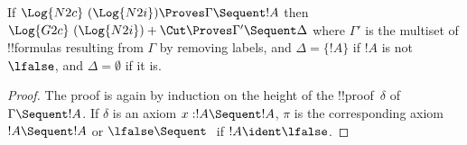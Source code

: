 \documentclass[../../../include/open-logic-section]{subfiles}
\begin{document}


\begin{prop} If $\Log{N2c}\ (\Log{N2i}) \Proves
\Gamma \Sequent !A$ then $\Log{G2c}\ (\Log{N2i}) + \Cut \Proves \Gamma'
\Sequent \Delta$ where $\Gamma'$ is the multiset of !!{formula}s
resulting from $\Gamma$ by removing labels, and $\Delta = \{!A\}$ if
$!A$ is not~$\lfalse$, and $\Delta = \emptyset$ if it is.
\end{prop}

\begin{proof}
The proof is again by induction on the height of the
!!{proof}~$\delta$ of $\Gamma \Sequent !A$. If $\delta$ is an axiom
$x:!A \Sequent !A$, $\pi$ is the corresponding axiom $!A \Sequent !A$
or $\lfalse \Sequent \ $ if $!A \ident \lfalse$.


\end{proof}
\end{document}
